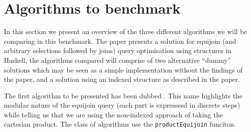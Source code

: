 \section{Algorithms to benchmark}
In this section we present an overview of the three different algorithms we will
be comparing in this benchmark. The paper \relalg{} presents a solution for
equijoin (and arbitrary selections followed by joins) query optimisation using
structures in Haskell, the algorithms compared will comprise of two alternative
``dummy'' solutions which may be seen as a simple implementation without the
findings of the paper, and a solution using an indexed structure as described
in the paper.

The first algorithm to be presented has been dubbed \modularproduct{}. This name
highlights the modular nature of the equijoin query (each part is expressesd in
discrete steps) while telling us that we are using the non-indexed approach of taking the
cartesian product. The \modularproduct{} class of algorithms use the
\lstinline[language=Haskell]{productEquijoin} funciton.


